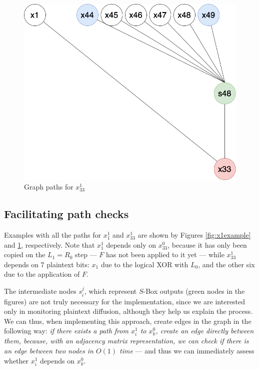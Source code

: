 \documentclass{report}
\begin{document}
\begin{figure}[h!]
    \centering
    \includegraphics[scale=0.3]{Grafo_DES-node-example.png}
    \caption{Graph paths for $x_{33}^1$}
    \label{fig:x33example}
\end{figure}

\subsection{Facilitating path checks}\label{sec:graph-simplication}
Examples with all the paths for $x_1^1$ and $x_{33}^1$ are shown by Figures \ref{fig:x1example} and \ref{fig:x33example}, respectively. Note that $x_1^1$ depends only on $x_{33}^0$, because it has only been copied on the $L_1 = R_0$ step --- $F$ has not been applied to it yet --- while $x_{33}^1$ depends on 7 plaintext bits: $x_1$ due to the logical XOR with $L_0$, and the other six due to the application of $F$.

The intermediate nodes $s_i^j$, which represent $S$-Box outputs (green nodes in the figures) are not truly necessary for the implementation, since we are interested only in monitoring plaintext diffusion, although they help us explain the process. We can thus, when implementing this approach, create edges in the graph in the following way: \emph{if there exists a path from $x_i^1$ to $x_k^0$, create an edge directly between them, because, with an adjacency matrix representation, we can check if there is an edge between two nodes in $O(1)$ time} --- and thus we can immediately assess whether $x_i^1$ depends on $x_k^0$.
\end{document}
